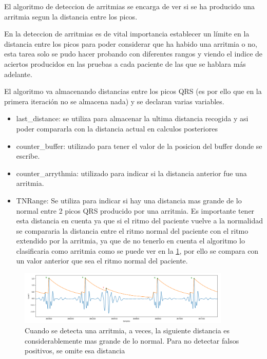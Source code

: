 El algoritmo de deteccion de arritmias se encarga de ver si se ha producido una arritmia segun la
distancia entre los picos.

En la deteccion de arritmias es de vital importancia establecer un límite en la distancia entre los picos
para poder considerar que ha habido una arritmia o no, esta tarea solo se pudo hacer probando con diferentes
rangos y viendo el indice de aciertos producidos en las pruebas a cada paciente de las que se hablara más adelante. 

El algoritmo va almacenando distancias entre los picos QRS (es por ello que en la primera iteración no se almacena nada)
y se declaran varias variables.

\begin{itemize}
    \item last\_distance: se utiliza para almacenar la ultima distancia recogida y asi poder compararla con la distancia 
    actual en calculos posteriores
    \item counter\_buffer: utilizado para tener el valor de la posicion del buffer donde se escribe.
    \item counter\_arrythmia: utilizado para indicar si la distancia anterior fue una arritmia.
    \item TNRange: Se utiliza para indicar si hay una distancia mas grande de lo normal entre 2 picos QRS producido
    por una arritmia. Es importante tener esta distancia en cuenta ya que si el ritmo del paciente vuelve a la
    normalidad se compararia la distancia entre el ritmo normal del paciente con el ritmo extendido por la arritmia,
    ya que de no tenerlo en cuenta el algoritmo lo clasificaria como arritmia como se puede ver en la \cref{fig:senial_explicacion_TNRANGE}, por ello se compara con un valor anterior
    que sea el ritmo normal del paciente.
\end{itemize}

\begin{figure}[h!]
    \centering
    \includegraphics[width=0.9\textwidth]{./Images/img_algoritmo/senial_explicacion_TNRANGE.png}
    \caption{Cuando se detecta una arritmia, a veces, la siguiente distancia es considerablemente mas grande de lo normal. Para no detectar falsos positivos, se omite esa distancia}
    \label{fig:senial_explicacion_TNRANGE}
\end{figure}

